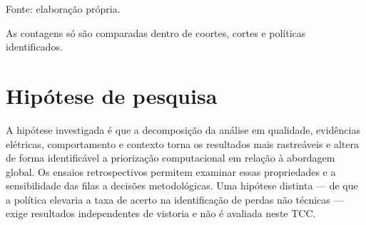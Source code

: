 {\small\noindent Fonte: elaboração própria.\par}


As contagens só são comparadas dentro de coortes, cortes e políticas identificados.

\section{Hipótese de pesquisa}\label{hipuxf3tese-de-pesquisa}

A hipótese investigada é que a decomposição da análise em qualidade, evidências elétricas, comportamento e contexto torna os resultados mais rastreáveis e altera de forma identificável a priorização computacional em relação à abordagem global. Os ensaios retrospectivos permitem examinar essas propriedades e a sensibilidade das filas a decisões metodológicas. Uma hipótese distinta --- de que a política elevaria a taxa de acerto na identificação de perdas não técnicas --- exige resultados independentes de vistoria e não é avaliada neste TCC.
